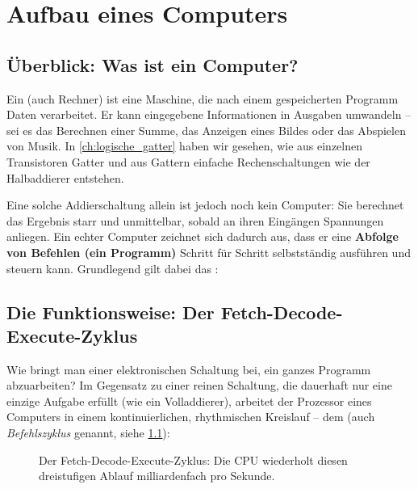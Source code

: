\chapter[Aufbau eines Computers]{Aufbau eines Computers}\label{ch:aufbau_computer}

\section{Überblick: Was ist ein Computer?}

Ein  (auch Rechner) ist eine Maschine, die nach einem gespeicherten Programm Daten verarbeitet. Er kann eingegebene Informationen in Ausgaben umwandeln -- sei es das Berechnen einer Summe, das Anzeigen eines Bildes oder das Abspielen von Musik. In \cref{ch:logische_gatter} haben wir gesehen, wie aus einzelnen Transistoren Gatter und aus Gattern einfache Rechenschaltungen wie der Halbaddierer entstehen. 

Eine solche Addierschaltung allein ist jedoch noch kein Computer: Sie berechnet das Ergebnis starr und unmittelbar, sobald an ihren Eingängen Spannungen anliegen. Ein echter Computer zeichnet sich dadurch aus, dass er eine \textbf{Abfolge von Befehlen (ein Programm)} Schritt für Schritt selbstständig ausführen und steuern kann. Grundlegend gilt dabei das :

\begin{center}
    
\end{center}

\section{Die Funktionsweise: Der Fetch-Decode-Execute-Zyklus}\label{sec:fde}

Wie bringt man einer elektronischen Schaltung bei, ein ganzes Programm abzuarbeiten? Im Gegensatz zu einer reinen Schaltung, die dauerhaft nur eine einzige Aufgabe erfüllt (wie ein Volladdierer), arbeitet der Prozessor eines Computers in einem kontinuierlichen, rhythmischen Kreislauf -- dem  (auch \emph{Befehlszyklus} genannt, siehe \cref{fig:fde}):

\begin{figure}[H]
    \centering
    
    \caption{Der Fetch-Decode-Execute-Zyklus: Die \gls{CPU} wiederholt diesen dreistufigen Ablauf milliardenfach pro Sekunde.}
    \label{fig:fde}
\end{figure}

